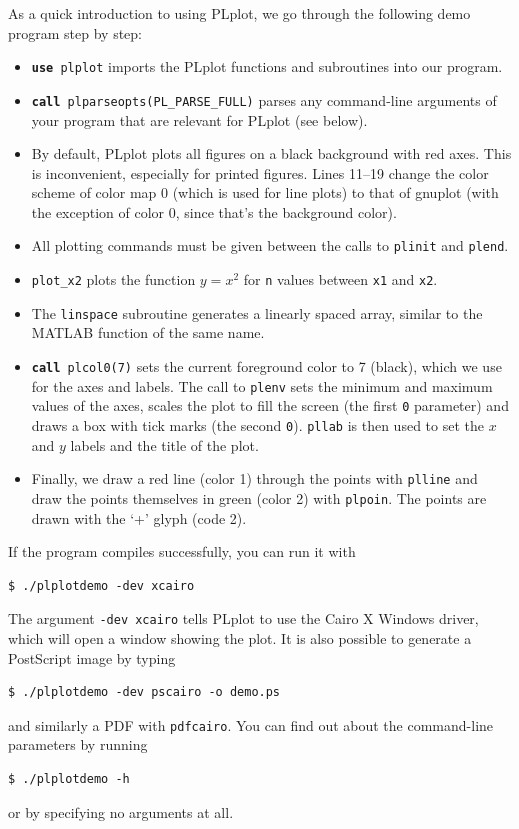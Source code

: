 \documentclass[openany,oneside]{report}
\newcommand{\keyword}[1]{\texttt{\bfseries\color{DarkBlue}#1}}
\begin{document}
As a quick introduction to using PLplot, we go through the following demo program step by step:

\begin{itemize}
  \item \texttt{\keyword{use} plplot} imports the PLplot functions and subroutines into our program.
  \item \texttt{\keyword{call} plparseopts(PL\_PARSE\_FULL)} parses any command-line arguments of your program that are relevant for PLplot (see below).
  \item By default, PLplot plots all figures on a black background with red axes.
    This is inconvenient, especially for printed figures.
    Lines 11--19 change the color scheme of color map 0 (which is used for line plots) to that of gnuplot (with the exception of color 0, since that's the background color).
  \item All plotting commands must be given between the calls to \texttt{plinit} and \texttt{plend}.
  \item \texttt{plot\_x2} plots the function $y=x^2$ for \texttt{n} values between \texttt{x1} and \texttt{x2}.
  \item The \texttt{linspace} subroutine generates a linearly spaced array, similar to the MATLAB function of the same name.
  \item \texttt{\keyword{call} plcol0(7)} sets the current foreground color to 7 (black), which we use for the axes and labels.
    The call to \texttt{plenv} sets the minimum and maximum values of the axes, scales the plot to fill the screen (the first \texttt{0} parameter) and draws a box with tick marks (the second \texttt{0}).
    \texttt{pllab} is then used to set the $x$ and $y$ labels and the title of the plot.
  \item Finally, we draw a red line (color 1) through the points with \texttt{plline} and draw the points themselves in green (color 2) with \texttt{plpoin}.
    The points are drawn with the `+' glyph (code 2).
\end{itemize}
If the program compiles successfully, you can run it with
\begin{verbatim}
$ ./plplotdemo -dev xcairo
\end{verbatim}
The argument \texttt{-dev xcairo} tells PLplot to use the Cairo X Windows driver, which will open a window showing the plot.
It is also possible to generate a PostScript image by typing
\begin{verbatim}
$ ./plplotdemo -dev pscairo -o demo.ps
\end{verbatim}
and similarly a PDF with \texttt{pdfcairo}. You can find out about the command-line parameters by running
\begin{verbatim}
$ ./plplotdemo -h
\end{verbatim}
or by specifying no arguments at all.
\end{document}

